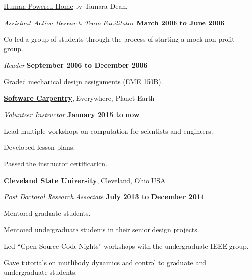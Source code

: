 \documentclass[10pt]{article}
\newenvironment{outerlist}[1][\enskip\textbullet]%
        {\begin{itemize}[#1]}{\end{itemize}%
         \vspace{-.6\baselineskip}}
\newenvironment{innerlist}[1][\enskip\textbullet]%
        {\begin{compactitem}[#1]}{\end{compactitem}}
\newcommand{\blankline}{\quad\pagebreak[2]}
\begin{document}
\begin{outerlist}
\begin{innerlist}
        \href{http://www.thehumanpoweredhome.com/}{\underline{Human Powered
        Home}} by Tamara Dean.
  \end{innerlist}
  \item[] \textit{Assistant Action Research Team Facilitator}%
    \hfill \textbf{March 2006 to June 2006}
  \begin{innerlist}
    \item Co-led a group of students through the process of starting a mock
        non-profit group.
  \end{innerlist}
  \item[] \textit{Reader}%
    \hfill \textbf{September 2006 to December 2006}
  \begin{innerlist}
    \item Graded mechanical design assignments (EME 150B).
  \end{innerlist}
\end{outerlist}

\blankline

\href{http://www.software-carpentry.org}{\textbf{Software Carpentry}},
Everywhere, Planet Earth
\begin{outerlist}
  \item[] \textit{Volunteer Instructor}%
    \hfill \textbf{January 2015 to now}
  \begin{innerlist}
    \item Lead multiple workshops on computation for scientists and engineers.
    \item Developed lesson plans.
    \item Passed the instructor certification.
  \end{innerlist}
\end{outerlist}

\blankline

\href{http://csuohio.edu}{\textbf{Cleveland State University}}, Cleveland, Ohio USA
\begin{outerlist}
  \item[] \textit{Post Doctoral Research Associate}
    \hfill \textbf{July 2013 to December 2014}
  \begin{innerlist}
    \item Mentored graduate students.
    \item Mentored undergraduate students in their senior design projects.
    \item Led ``Open Source Code Nights'' workshops with the undergraduate IEEE group.
    \item Gave tutorials on mutlibody dynamics and control to graduate and
      undergraduate students.
  \end{innerlist}
\end{outerlist}
\end{document}
